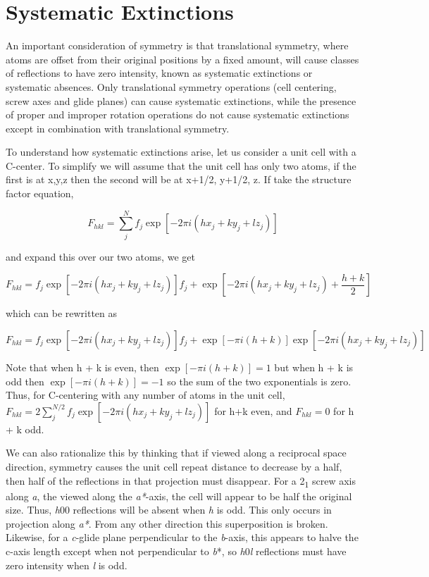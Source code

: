 \section{Systematic Extinctions}

An important consideration of symmetry is that translational symmetry, where atoms are offset from their original positions by a fixed amount, will cause classes of reflections to have zero intensity, known as systematic extinctions or systematic absences. Only translational symmetry operations (cell centering, screw axes and glide planes) can cause systematic extinctions, while the presence of proper and improper rotation operations do not cause systematic extinctions except in combination with translational symmetry. 

To understand how systematic extinctions arise, let us consider a unit cell with a C-center. To simplify we will assume that the unit cell has only two atoms, if the first is at x,y,z then the second will be at x+1/2, y+1/2, z. If take the structure factor equation, 

$$F_{hkl}=\sum_j^N f_j \exp⁡[-2\pi i(hx_j + ky_j + lz_j)]$$

and expand this over our two atoms, we get 

$$F_{hkl} = f_j \exp⁡[-2\pi i(hx_j + ky_j + lz_j)] f_j + \exp⁡[-2\pi i(hx_j + ky_j + lz_j) + \frac{h+k}{2}] $$

which can be rewritten as 

$$ F_{hkl} = f_j \exp⁡[-2\pi i(hx_j + ky_j + lz_j)] f_j + \exp⁡[-\pi i(h + k)] \exp⁡[-2\pi i(hx_j + ky_j + lz_j) ] $$

Note that when h + k is even, then $\exp⁡[-\pi i(h + k)] = 1$ but when h + k is odd then $\exp⁡[-\pi i(h + k)] = -1$ so the sum of the two exponentials is zero. Thus, for C-centering with any number of atoms in the unit cell,  $F_{hkl}=2\sum_j^{N/2} f_j \exp⁡[-2\pi i(hx_j + ky_j + lz_j)]$ for h+k even, and $F_{hkl}=0$ for h + k odd. 

We can also rationalize this by thinking that if viewed along a reciprocal space direction, symmetry causes the unit cell repeat distance to decrease by a half, then half of the reflections in that projection must disappear. For a 2\textsubscript{1} screw axis along \textit{a}, the viewed along the \textit{a*}-axis, the cell will appear to be half the original size. Thus, \textit{h}00 reflections will be absent when \textit{h} is odd. This only occurs in projection along \textit{a*}. From any other direction this superposition is broken. Likewise, for a \textit{c}-glide plane perpendicular to the \textit{b}-axis, this appears to halve the c-axis length except when not perpendicular to \textit{b}*, so \textit{h}0\textit{l} reflections must have zero intensity when \textit{l} is odd.

